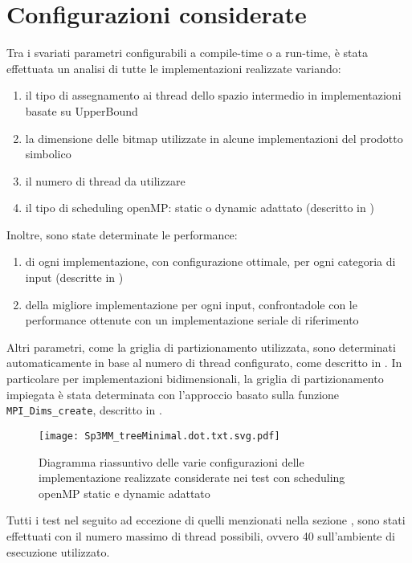 \section{Configurazioni considerate}
Tra i svariati parametri configurabili a compile-time o a run-time, è stata effettuata 
un analisi di tutte le implementazioni realizzate variando:
\begin{enumerate}
	\item	il tipo di assegnamento ai thread dello spazio intermedio in implementazioni basate su UpperBound 
	\item	la dimensione delle bitmap utilizzate in alcune implementazioni del prodotto simbolico %
	\item	il numero di thread da utilizzare 
	\item	il tipo di scheduling openMP: static o dynamic adattato (descritto in )
	\setcounter{queriesCounter}{\value{enumi}}
\end{enumerate}
Inoltre, sono state determinate le performance:
\begin{enumerate}
	\setcounter{queriesCounter}{\value{enumi}}
	\item	di ogni implementazione, con configurazione ottimale, per ogni categoria di input (descritte in )
	\item	della migliore implementazione per ogni input, confrontadole con le performance ottenute con un implementazione seriale di riferimento
\end{enumerate}
Altri parametri, come la griglia di partizionamento utilizzata, sono determinati automaticamente in base al numero di thread configurato,
come descritto in .
In particolare per implementazioni bidimensionali, la griglia di partizionamento impiegata è stata determinata con l'approccio
basato sulla funzione \verb|MPI_Dims_create|, descritto in .\\
\begin{figure}[H]
  \centering \texttt{[image: Sp3MM\_treeMinimal.dot.txt.svg.pdf]}
  \caption[implementazioni Sp3MM realizzate]
  {Diagramma riassuntivo delle varie configurazioni delle implementazione realizzate considerate nei test con scheduling openMP static e dynamic adattato}
  \decoRule \label{fig:q1}
\end{figure}
\voidLine
Tutti i test nel seguito ad eccezione di quelli menzionati nella sezione , sono stati effettuati 
con il numero massimo di thread possibili, ovvero 40 sull'ambiente di esecuzione utilizzato.\\


